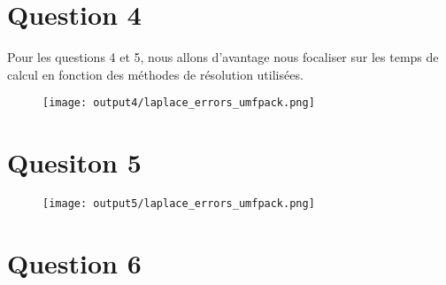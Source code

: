 \documentclass[11pt,a4paper]{report}
\begin{document}
			\section*{Question 4}
				
				Pour les questions 4 et 5, nous allons d'avantage nous focaliser sur les temps de calcul en fonction des méthodes de résolution utilisées.
				
							
				\begin{figure}[H]
					\centering
					\texttt{[image: output4/laplace\_errors\_umfpack.png]}
				
				\end{figure}
			
			\section*{Quesiton 5}
			
				\begin{figure}[H]
					\centering
					\texttt{[image: output5/laplace\_errors\_umfpack.png]}
				\end{figure}
		
		\section*{Question 6}
\end{document}
